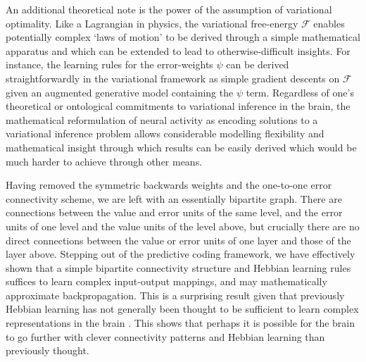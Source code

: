 An additional theoretical note is the power of the assumption of variational optimality. Like a Lagrangian in physics, the variational free-energy $\mathcal{F}$ enables potentially complex `laws of motion' to be derived through a simple mathematical apparatus and which can be extended to lead to otherwise-difficult insights. For instance, the learning rules for the error-weights $\psi$ can be derived straightforwardly in the variational framework as simple gradient descents on $\mathcal{F}$ given an augmented generative model containing the $\psi$ term. Regardless of one's theoretical or ontological commitments to variational inference in the brain, the mathematical reformulation of neural activity as encoding solutions to a variational inference problem allows considerable modelling flexibility and mathematical insight through which results can be easily derived which would be much harder to achieve through other means. 

Having removed the symmetric backwards weights and the one-to-one error connectivity scheme, we are left with an essentially bipartite graph. There are connections between the value and error units of the same level, and the error units of one level and the value units of the level above, but crucially there are no direct connections between the value or error units of one layer and those of the layer above. Stepping out of the predictive coding framework, we have effectively shown that a simple bipartite connectivity structure and Hebbian learning rules suffices to learn complex input-output mappings, and may mathematically approximate backpropagation. This is a surprising result given that previously Hebbian learning has not generally been thought to be sufficient to learn complex representations in the brain \citep{baldi2016theory}. This shows that perhaps it is possible for the brain to go further with clever connectivity patterns and Hebbian learning than previously thought.

